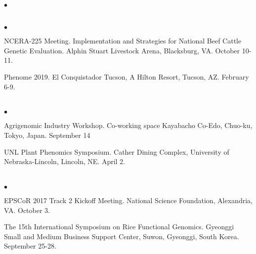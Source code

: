 \documentclass[margin,line,10pt]{res}
\newenvironment{list2}{
  \begin{list}{$\bullet$}{%
      \setlength{\itemsep}{0in}
      \setlength{\parsep}{0in} \setlength{\parskip}{0in}
      \setlength{\topsep}{0in} \setlength{\partopsep}{0in} 
      \setlength{\leftmargin}{0.2in}}}{\end{list}}
\begin{document}
\begin{resume}
\begin{list2}
\end{list2}



\section{}
\begin{list2}

\item NCERA-225 Meeting. Implementation and Strategies for National Beef Cattle Genetic Evaluation. Alphin Stuart Livestock Arena, Blacksburg, VA. October 10-11.

  \vspace{0.5cm}

\item Phenome 2019. El Conquistador Tucson, A Hilton Resort, Tucson, AZ. February 6-9.

\end{list2}




\section{}
\begin{list2}

  \item Agrigenomic Industry Workshop. Co-working space Kayabacho Co-Edo, Chuo-ku, Tokyo, Japan. September 14

    \vspace{0.5cm}
    
\item UNL Plant Phenomics Symposium. Cather Dining Complex, University of Nebraska-Lincoln, Lincoln, NE. April 2.

\end{list2}


\section{}
\begin{list2}

\item EPSCoR 2017 Track 2 Kickoff Meeting.  National Science Foundation, Alexandria, VA. October 3.
  
  \vspace{0.5cm}

\item The 15th International Symposium on Rice Functional Genomics. Gyeonggi Small and Medium Business Support Center, Suwon, Gyeonggi, South Korea. September 25-28.


\end{list2}
\end{resume}
\end{document}
